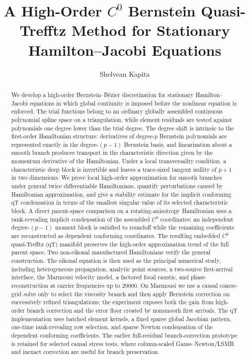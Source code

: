 \documentclass[preprint,12pt]{elsarticle}
\begin{document}
\begin{frontmatter}

\title{A High-Order $C^0$ Bernstein Quasi-Trefftz Method for Stationary Hamilton--Jacobi Equations}

\author[1]{Shelvean Kapita}
\address[1]{Department of Mathematics, Texas A\&M University, College Station, Texas, USA}

\begin{abstract}
We develop a high-order Bernstein--B\'ezier discretization for stationary Hamilton--Jacobi equations in which global continuity is imposed before the nonlinear equation is enforced.  The trial functions belong to an ordinary globally assembled continuous polynomial spline space on a triangulation, while element residuals are tested against polynomials one degree lower than the trial degree.  The degree shift is intrinsic to the first-order Hamiltonian structure: derivatives of degree-$p$ Bernstein polynomials are represented exactly in the degree-$(p-1)$ Bernstein basis, and linearization about a smooth branch produces transport in the characteristic direction given by the momentum derivative of the Hamiltonian.  Under a local transversality condition, a characteristic deep block is invertible and leaves a trace-sized tangent nullity of $p+1$ in two dimensions.  We prove local high-order approximation for smooth branches under general twice differentiable Hamiltonians, quantify perturbations caused by Hamiltonian approximation, and give a stability estimate for the implicit conforming qT condensation in terms of the smallest singular value of its selected characteristic block.  A direct parent-space comparison on a rotating-anisotropy Hamiltonian uses a rank-revealing implicit condensation of the assembled $C^0$ coordinates: an independent degree-$(p-1)$ moment block is satisfied to roundoff while the remaining coefficients are reconstructed as dependent conforming coordinates.  The resulting embedded $C^0$ quasi-Trefftz (qT) manifold preserves the high-order approximation trend of the full parent space.  Two non-eikonal manufactured Hamiltonians verify the general construction.  The eikonal equation is then used as the principal numerical study, including heterogeneous propagation, analytic point sources, a two-source first-arrival interface, the Marmousi velocity model, a factored focal caustic, and phase reconstruction at carrier frequencies up to 20000.  On Marmousi we use a causal coarse-grid solve only to select the viscosity branch and then apply Bernstein correction on successively refined triangulations; the experiment exposes both the gain from high-order branch correction and the error floor created by nonsmooth first arrivals.  The qT implementation uses batched element kernels, a fixed sparse global Jacobian pattern, one-time rank-revealing row selection, and sparse Newton condensation of the dependent conforming coefficients.  The earlier full-residual branch-correction prototype is retained for selected causal stress tests, where column-scaled Gauss--Newton/LSMR and inexact correction are useful for branch preservation.
\end{abstract}


\end{frontmatter}
\end{document}
